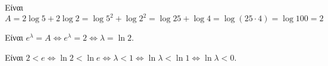 \begin{alist}
\item Είναι
\[A = 2\log 5 + 2\log 2 = \log 5^2 + \log 2^2 = \log 25 + \log 4 = \log(25 \cdot 4) = \log 100 = 2\]
\item Είναι $e^\lambda = A \Leftrightarrow e^\lambda = 2 \Leftrightarrow \lambda = \ln 2$.
\item Είναι $2 < e \Leftrightarrow \ln 2 < \ln e \Leftrightarrow \lambda < 1 \Leftrightarrow \ln \lambda < \ln 1 \Leftrightarrow \ln \lambda < 0$.
\end{alist}

